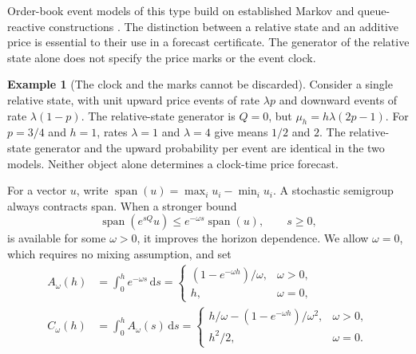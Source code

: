 \documentclass[11pt]{article}
\theoremstyle{plain}
\theoremstyle{definition}
\newtheorem{example}[theorem]{Example}
\theoremstyle{remark}
\newcommand{\dd}{\,\mathrm d}
\DeclareMathOperator{\spn}{span}
\begin{document}
Order-book event models of this type build on established Markov and
queue-reactive constructions
\citep{ContStoikovTalreja2010,HuangLehalleRosenbaum2015}.
The distinction between a relative state and an additive price is
essential to their use in a forecast certificate. The generator of the
relative state alone does not specify the price marks or the event clock.

\begin{example}[The clock and the marks cannot be discarded]
\label{ex:bookclock}
Consider a single relative state, with unit upward price events of
rate \(\lambda p\) and downward events of rate \(\lambda(1-p)\).
The relative-state generator is \(Q=0\), but
\(\mu_h=h\lambda(2p-1)\). For \(p=3/4\) and \(h=1\), rates
\(\lambda=1\) and \(\lambda=4\) give means \(1/2\) and \(2\).
The relative-state generator and the upward probability per event
are identical in the two models. Neither object alone determines a
clock-time price forecast.
\end{example}

For a vector \(u\), write
\(\spn(u)=\max_i u_i-\min_i u_i\). A stochastic semigroup always
contracts span. When a stronger bound
\begin{equation}\label{eq:spanmixing}
 \spn(e^{sQ}u)\le e^{-\omega s}\spn(u),\qquad s\ge0,
\end{equation}
is available for some \(\omega>0\), it improves the horizon dependence.
We allow \(\omega=0\), which requires no mixing assumption, and set
\begin{align}
 A_\omega(h)&=\int_0^h e^{-\omega s}\dd s
 =\begin{cases}(1-e^{-\omega h})/\omega,&\omega>0,\\h,&\omega=0,
 \end{cases}\label{eq:mixA}\\
 C_\omega(h)&=\int_0^h A_\omega(s)\dd s
 =\begin{cases}h/\omega-(1-e^{-\omega h})/\omega^2,&\omega>0,\\
 h^2/2,&\omega=0.
 \end{cases}\label{eq:mixC}
\end{align}
\end{document}
